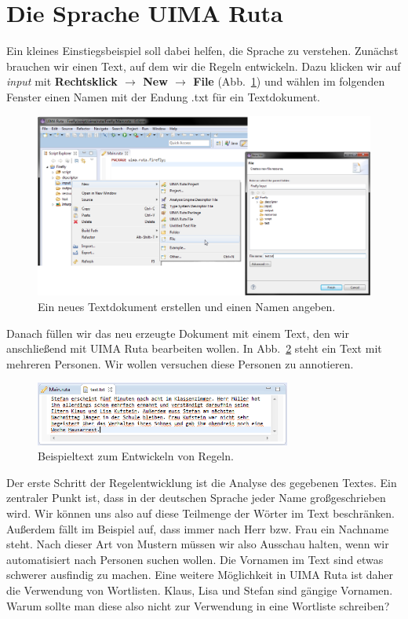 \documentclass{article}
\begin{document}
\section{Die Sprache UIMA Ruta}\label{lang}
Ein kleines Einstiegsbeispiel soll dabei helfen, die Sprache zu verstehen. Zunächst brauchen wir einen Text, auf dem wir die Regeln entwickeln. Dazu klicken wir auf \textit{input} mit \textbf{Rechtsklick $\rightarrow$ New $\rightarrow$ File} (Abb.~\ref{newdoc}) und wählen im folgenden Fenster einen Namen mit der Endung \glqq .txt\grqq{} für ein Textdokument.

\begin{figure}
\centering
\includegraphics[width=1\textwidth]{figs/capture(13+14).png}
\caption{Ein neues Textdokument erstellen und einen Namen angeben.}
\label{newdoc}
\end{figure}

Danach füllen wir das neu erzeugte Dokument mit einem Text, den wir anschließend mit UIMA Ruta bearbeiten wollen. In Abb.~\ref{text} steht ein Text mit mehreren Personen. Wir wollen versuchen diese Personen zu annotieren.

\begin{figure}
\centering
\includegraphics[width=0.75\textwidth]{figs/capture_text.png}
\caption{Beispieltext zum Entwickeln von Regeln.}
\label{text}
\end{figure}

Der erste Schritt der Regelentwicklung ist die Analyse des gegebenen Textes. Ein zentraler Punkt ist, dass in der deutschen Sprache jeder Name großgeschrieben wird. Wir können uns also auf diese Teilmenge der Wörter im Text beschränken. Außerdem fällt im Beispiel auf, dass immer nach \glqq Herr\grqq{} bzw. \glqq Frau\grqq{} ein Nachname steht. Nach dieser Art von Mustern müssen wir also Ausschau halten, wenn wir automatisiert nach Personen suchen wollen. Die  Vornamen im Text sind etwas schwerer ausfindig zu machen. Eine weitere Mög\-lich\-keit in UIMA Ruta ist daher die Verwendung von Wortlisten. \glqq Klaus\grqq{}, \glqq Lisa\grqq{} und \glqq Stefan\grqq{} sind gängige Vornamen. Warum sollte man diese also nicht zur Verwendung in eine Wortliste schreiben?
\end{document}
